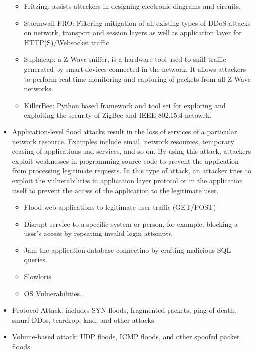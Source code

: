 \begin{itemize}
\begin{itemize}
        \item Fritzing: assists attackers in designing electronic diagrams and circuits.
        \item Stormwall PRO: Filtering mitigation of all existing types of DDoS attacks on network, transport and session layers as well as application layer for HTTP(S)/Websocket traffic.
        \item Suphacap: a Z-Wave sniffer, is a hardware tool used to sniff traffic generated by smart devices connected in the network. It allows attackers to perform real-time monitoring and capturing of packets from all Z-Wave networks.
        \item KillerBee: Python based framework and tool set for exploring and exploiting the security of ZigBee and IEEE 802.15.4 netowrk.
    \end{itemize}
    \item Application-level flood attacks result in the loss of services of a particular network resource. Examples include email, network resources, temporary ceasing of applications and services, and so on. By using this attack, attackers exploit weaknesses in programming source code to prevent the application from processing legitimate requests. In this type of attack, an attacker tries to exploit the vulnerabilities in application layer protocol or in the application itself to prevent the access of the application to the legitimate user.
    \begin{itemize}
        \item Flood web applications to legitimate user traffic (GET/POST)
        \item Disrupt service to a specific system or person, for example, blocking a user's access by repeating invalid login attempts.
        \item Jam the application database connectino by crafting malicious SQL queries.
        \item Slowloris
        \item OS Vulnerabilities.
    \end{itemize}
    \item Protocol Attack: includes SYN floods, fragmented packets, ping of death, smurf DDos, teardrop, land, and other attacks.
    \item Volume-based attack: UDP floods, ICMP floods, and other spoofed packet floods.
\end{itemize}

